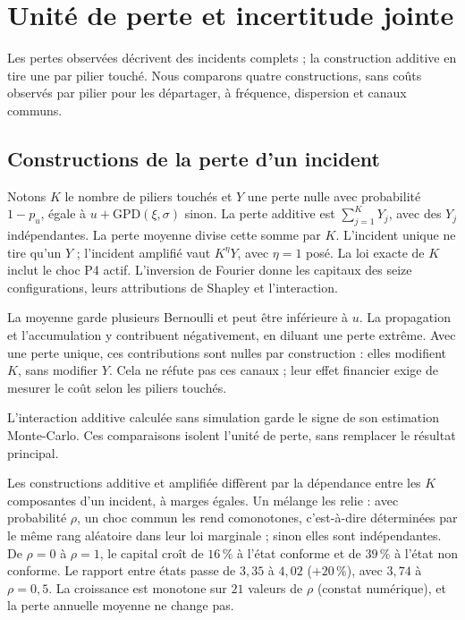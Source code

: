 \section{Unité de perte et incertitude jointe}
\label{sec:institut-unite-incertitude}

Les pertes observées décrivent des incidents complets ; la construction additive en
tire une par pilier touché. Nous comparons quatre constructions, sans coûts observés
par pilier pour les départager, à fréquence, dispersion et canaux communs.

\subsection{Constructions de la perte d'un incident}
\label{sec:institut-unite-perte}

Notons $K$ le nombre de piliers touchés et $Y$ une perte nulle avec probabilité
$1-p_u$, égale à $u+\mathrm{GPD}(\xi,\sigma)$ sinon. La perte additive est
$\sum_{j=1}^K Y_j$, avec des $Y_j$ indépendantes. La perte moyenne divise cette somme
par $K$. L'incident unique ne tire qu'un $Y$ ; l'incident amplifié vaut $K^\eta Y$,
avec $\eta=1$ posé. La loi exacte de $K$ inclut le choc P4 actif. L'inversion de Fourier
donne les capitaux des seize configurations, leurs attributions de Shapley et l'interaction.



La moyenne garde plusieurs Bernoulli et peut être inférieure à $u$. La propagation
et l'accumulation y contribuent négativement, en diluant une perte extrême.
Avec une perte unique, ces contributions sont nulles par construction : elles
modifient $K$, sans modifier $Y$. Cela ne réfute pas ces canaux ; leur effet
financier exige de mesurer le coût selon les piliers touchés.

L'interaction additive calculée sans simulation garde le signe de son estimation
Monte-Carlo. Ces comparaisons isolent l'unité de perte, sans remplacer le résultat principal.

Les constructions additive et amplifiée diffèrent par la dépendance entre les $K$ composantes d'un
incident, à marges égales. Un mélange les relie : avec probabilité $\rho$, un choc commun les rend comonotones, c'est-à-dire déterminées par le même rang aléatoire dans leur loi marginale ; sinon elles sont indépendantes. De $\rho=0$ à $\rho=1$, le capital croît de $16\,\%$ à l'état conforme et
de $39\,\%$ à l'état non conforme. Le rapport entre états passe de $3{,}35$ à $4{,}02$ ($+20\,\%$), avec $3{,}74$
à $\rho=0{,}5$. La croissance est monotone sur $21$ valeurs de $\rho$ (constat numérique), et la perte
annuelle moyenne ne change pas.

